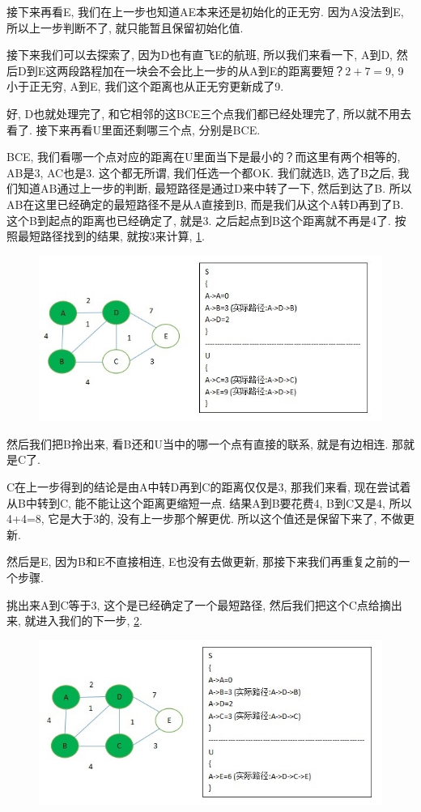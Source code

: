 接下来再看E, 我们在上一步也知道AE本来还是初始化的正无穷. 因为A没法到E, 所以上一步判断不了, 就只能暂且保留初始化值. 

接下来我们可以去探索了, 因为D也有直飞E的航班, 所以我们来看一下, A到D, 然后D到E这两段路程加在一块会不会比上一步的从A到E的距离要短？$2+7=9$, 9小于正无穷, A到E, 我们这个距离也从正无穷更新成了9.

好, D也就处理完了, 和它相邻的这BCE三个点我们都已经处理完了, 所以就不用去看了. 接下来再看U里面还剩哪三个点, 分别是BCE. 

BCE, 我们看哪一个点对应的距离在U里面当下是最小的？而这里有两个相等的, AB是3, AC也是3. 这个都无所谓, 我们任选一个都OK. 我们就选B, 选了B之后, 我们知道AB通过上一步的判断, 最短路径是通过D来中转了一下, 然后到达了B. 所以AB在这里已经确定的最短路径不是从A直接到B, 而是我们从这个A转D再到了B. 这个B到起点的距离也已经确定了, 就是3. 之后起点到B这个距离就不再是4了. 按照最短路径找到的结果, 就按3来计算, \ref{fig:img26_5}. 

\begin{figure}[ht]
  \centering
  \includegraphics[width=0.7\linewidth]{asset/20230924051224.jpg}
  \caption{}
  \label{fig:img26_5}
\end{figure}

然后我们把B拎出来, 看B还和U当中的哪一个点有直接的联系, 就是有边相连. 那就是C了. 

C在上一步得到的结论是由A中转D再到C的距离仅仅是3, 那我们来看, 现在尝试着从B中转到C, 能不能让这个距离更缩短一点. 结果A到B要花费4, B到C又是4, 所以4+4=8, 它是大于3的, 没有上一步那个解更优. 所以这个值还是保留下来了, 不做更新. 

然后是E, 因为B和E不直接相连, E也没有去做更新, 那接下来我们再重复之前的一个步骤. 

挑出来A到C等于3, 这个是已经确定了一个最短路径, 然后我们把这个C点给摘出来, 就进入我们的下一步, \ref{fig:img26_6}. 

\begin{figure}[ht]
  \centering
  \includegraphics[width=0.7\linewidth]{asset/20230924051225.jpg}
  \caption{}
  \label{fig:img26_6}
\end{figure}

